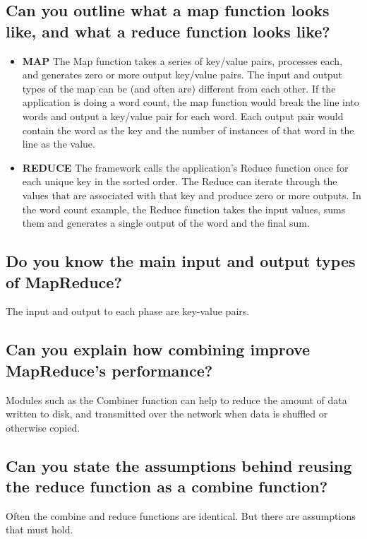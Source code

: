 \documentclass{article}
\begin{document}
\subsection{Can you outline what a map function looks like, and what a reduce function looks like?}

\begin{itemize}
    \item \textbf{MAP} The Map function takes a series of key/value pairs, processes each, and generates zero or more output key/value pairs. The input and output types of the map can be (and often are) different from each other. If the application is doing a word count, the map function would break the line into words and output a key/value pair for each word. Each output pair would contain the word as the key and the number of instances of that word in the line as the value.
    \item \textbf{REDUCE} The framework calls the application's Reduce function once for each unique key in the sorted order. The Reduce can iterate through the values that are associated with that key and produce zero or more outputs. In the word count example, the Reduce function takes the input values, sums them and generates a single output of the word and the final sum.
\end{itemize}

\subsection{Do you know the main input and output types of MapReduce?}

The input and output to each phase are key-value pairs.

\subsection{Can you explain how combining improve MapReduce's performance?}

Modules such as the Combiner function can help to reduce the amount of data written to disk, and transmitted over the network when data is shuffled or otherwise copied. 

\subsection{Can you state the assumptions behind reusing the reduce function as a combine function?}

Often the combine and reduce functions are identical. But there are assumptions that must hold. 
\end{document}
